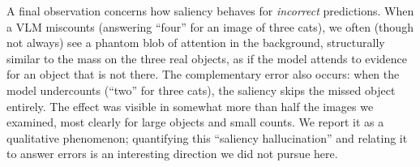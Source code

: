 A final observation concerns how saliency behaves for \emph{incorrect} predictions. When a VLM miscounts (answering ``four'' for an image of three cats), we often (though not always) see a phantom blob of attention in the background, structurally similar to the mass on the three real objects, as if the model attends to evidence for an object that is not there. The complementary error also occurs: when the model undercounts (``two'' for three cats), the saliency skips the missed object entirely. The effect was visible in somewhat more than half the images we examined, most clearly for large objects and small counts. We report it as a qualitative phenomenon; quantifying this ``saliency hallucination'' and relating it to answer errors is an interesting direction we did not pursue here.

